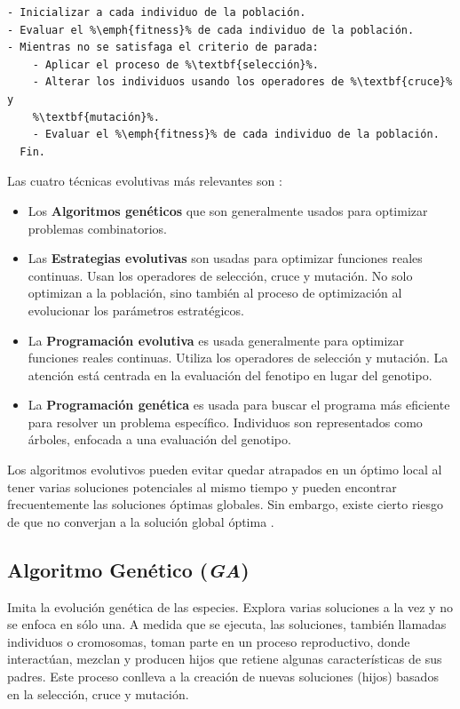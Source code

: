 \begin{lstlisting}[float=!h, caption=Algoritmo Evolutivo General\cite{PSO_0}, label=EA]
- Inicializar a cada individuo de la población.
- Evaluar el %\emph{fitness}% de cada individuo de la población.
- Mientras no se satisfaga el criterio de parada:
    - Aplicar el proceso de %\textbf{selección}%.
    - Alterar los individuos usando los operadores de %\textbf{cruce}% y
    %\textbf{mutación}%.
    - Evaluar el %\emph{fitness}% de cada individuo de la población.
  Fin.
\end{lstlisting}
\newpage
    Las cuatro técnicas evolutivas más relevantes son \cite{PSO_0}:
\begin{itemize}
    \item Los \textbf{Algoritmos genéticos} que son generalmente usados para
optimizar problemas combinatorios.
    \item Las \textbf{Estrategias evolutivas}\cite{SA_6} son usadas para optimizar
funciones reales continuas. Usan los operadores de selección, cruce y mutación.
No solo optimizan a la población, sino también al proceso de optimización al
evolucionar los parámetros estratégicos.
    \item La \textbf{Programación evolutiva}\cite{SA_7} es usada generalmente
para optimizar funciones reales continuas. Utiliza los operadores de selección y
mutación. La atención está centrada en la evaluación del fenotipo en lugar del
genotipo.
    \item La \textbf{Programación genética} \cite{SA_8} es usada para buscar el
programa más eficiente para resolver un problema específico. Individuos son
representados como árboles, enfocada a una evaluación del genotipo.
\end{itemize}

Los algoritmos evolutivos pueden evitar quedar atrapados en un óptimo local
al tener varias soluciones potenciales al mismo tiempo y pueden encontrar
frecuentemente las soluciones óptimas globales. Sin embargo, existe cierto
riesgo de que no converjan a la solución global óptima \cite{SA_4}.

\subsection{Algoritmo Genético (\emph{GA})}
\label{sect:metaga}
Imita la evolución genética de las especies. Explora varias soluciones a la vez
y no se enfoca en sólo una. A medida que se ejecuta, las soluciones, también
llamadas individuos o cromosomas, toman parte en un proceso reproductivo, donde
interactúan, mezclan y producen hijos que retiene algunas características de sus
padres. Este proceso conlleva a la creación de nuevas soluciones (hijos)
basados en la selección, cruce y mutación\cite{DoGeGr2007}.

